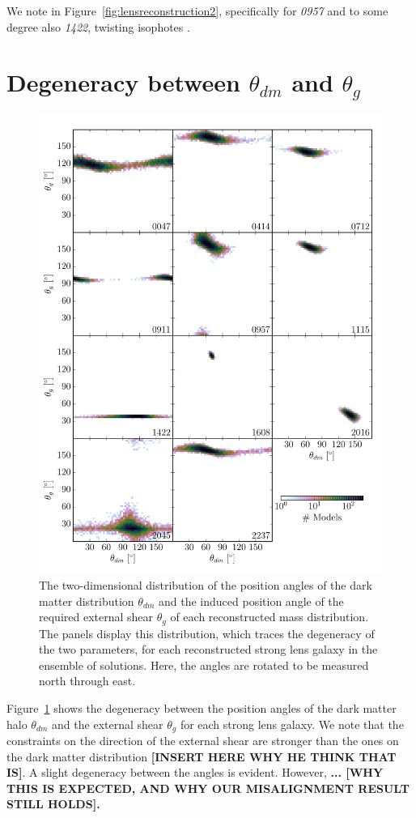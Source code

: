 \documentclass[useAMS,usenatbib]{mn2e}
\begin{document}
We note in Figure~\ref{fig:lensreconstruction2}, specifically for {\it0957} and to some degree also {\it1422}, twisting isophotes \citep[e.g.][]{1978ComAp...8...27B}.

\section{Degeneracy between $\theta_{dm}$ and $\theta_{g}$}\label{sec:shearshapedeg}
\begin{figure}
  \centering
  \includegraphics[width=.9\linewidth]{Figures/theta_scatter.pdf}
  \caption[width=\linewidth]{The two-dimensional distribution of the position angles of the dark matter distribution $\theta_{dm}$ and the induced position angle of the required external shear $\theta_{g}$ of each reconstructed mass distribution. The panels display this distribution, which traces the degeneracy of the two parameters, for each reconstructed strong lens galaxy in the ensemble of solutions. Here, the angles are rotated to be measured north through east.}
  \label{fig:thetascatter}
\end{figure}

Figure~\ref{fig:thetascatter} shows the degeneracy between the position angles of the dark matter halo $\theta_{dm}$ and the external shear $\theta_{g}$ for each strong lens galaxy. We note that the constraints on the direction of the external shear are stronger than the ones on the dark matter distribution \textbf{[INSERT HERE WHY HE THINK THAT IS]}. A slight degeneracy between the angles is evident. However, \textbf{... [WHY THIS IS EXPECTED, AND WHY OUR MISALIGNMENT RESULT STILL HOLDS].}
\end{document}
